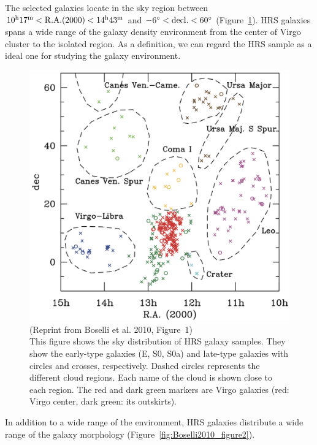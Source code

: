 The selected galaxies locate in the sky region between $10^{\mathrm{h}}17^{\mathrm{m}}< \mathrm{R.A.}(2000) < 14^{\mathrm{h}}43^{\mathrm{m}}$ and $-6^{\circ} < \mathrm{decl.} < 60^{\circ}$ (Figure~\ref{fig:Boselli2010_figure1}).
HRS galaxies spans a wide range of the galaxy density environment from the center of Virgo cluster to the isolated region.
As a definition, we can regard the HRS sample as a ideal one for studying the galaxy environment.

\begin{figure}[htbp]
	\centering
	\includegraphics[width=.7\linewidth]{Chapter_3/Figures/Boselli2010_Figure1.png}
    \caption[Reprint from Boselli et al. 2010 (Figure~1)]{\label{fig:Boselli2010_figure1}
        (Reprint from Boselli et al. 2010, Figure~1)\\
        This figure shows the sky distribution of HRS galaxy samples.
        They show the early-type galaxies (E, S0, S0a) and late-type galaxies with circles and crosses, respectively.
        Dashed circles represents the different cloud regions. Each name of the cloud is shown close to each region.
        The red and dark green markers are Virgo galaxies (red: Virgo center, dark green: its outskirts).
    }
\end{figure}

In addition to a wide range of the environment, HRS galaxies distribute a wide range of the galaxy morphology (Figure~\ref{fig:Boselli2010_figure2}).

